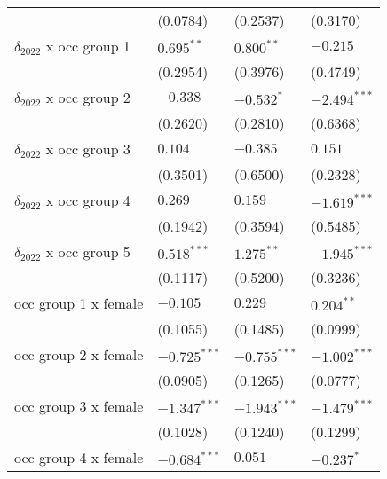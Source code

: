\begin{tabular}{llll}
                                       &           (0.0784) &           (0.2537) &           (0.3170) \\
$\delta_{2022}$ x occ group 1          &       $0.695^{**}$ &       $0.800^{**}$ &           $-0.215$ \\
                                       &           (0.2954) &           (0.3976) &           (0.4749) \\
$\delta_{2022}$ x occ group 2          &           $-0.338$ &         $-0.532^*$ &     $-2.494^{***}$ \\
                                       &           (0.2620) &           (0.2810) &           (0.6368) \\
$\delta_{2022}$ x occ group 3          &            $0.104$ &           $-0.385$ &            $0.151$ \\
                                       &           (0.3501) &           (0.6500) &           (0.2328) \\
$\delta_{2022}$ x occ group 4          &            $0.269$ &            $0.159$ &     $-1.619^{***}$ \\
                                       &           (0.1942) &           (0.3594) &           (0.5485) \\
$\delta_{2022}$ x occ group 5          &      $0.518^{***}$ &       $1.275^{**}$ &     $-1.945^{***}$ \\
                                       &           (0.1117) &           (0.5200) &           (0.3236) \\
occ group 1 x female                   &           $-0.105$ &            $0.229$ &       $0.204^{**}$ \\
                                       &           (0.1055) &           (0.1485) &           (0.0999) \\
occ group 2 x female                   &     $-0.725^{***}$ &     $-0.755^{***}$ &     $-1.002^{***}$ \\
                                       &           (0.0905) &           (0.1265) &           (0.0777) \\
occ group 3 x female                   &     $-1.347^{***}$ &     $-1.943^{***}$ &     $-1.479^{***}$ \\
                                       &           (0.1028) &           (0.1240) &           (0.1299) \\
occ group 4 x female                   &     $-0.684^{***}$ &            $0.051$ &         $-0.237^*$ \\

\end{tabular}
